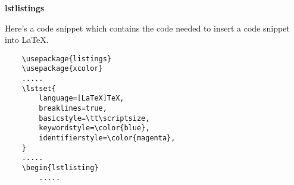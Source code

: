 \documentclass[a4paper,12pt]{article}
\begin{document}
\newpage
\begin{center}
	\bf{\Huge{lstlistings}}
\end{center}
\bigskip
Here's a code snippet which contains the code needed to insert a code snippet into LaTeX.
\begin{lstlisting}
	\usepackage{listings}
	\usepackage{xcolor}
	.....
	\lstset{
		language=[LaTeX]TeX,
		breaklines=true,
		basicstyle=\tt\scriptsize,
		keywordstyle=\color{blue},
		identifierstyle=\color{magenta},
	}
	.....
	\begin{lstlisting}
		.....
\end{lstlisting}
\end{document}
